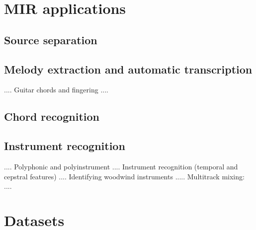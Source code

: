 \documentclass[journal]{IEEEtran}
\begin{document}
\section{MIR applications}
\subsection{Source separation}
\subsection{Melody extraction and automatic transcription}

\cite{benetos2013automatic,ohanlon2013automatic,peeters2006music}....
Guitar chords and fingering \cite{barbancho2012automatic}....
\subsection{Chord recognition}
\subsection{Instrument recognition}

\cite{martin1998musical,yu2014sparse}....
Polyphonic and polyinstrument \cite{hamel2009automatic}....
Instrument recognition (temporal and cepstral features) \cite{eronen2000musical}....
Identifying woodwind instruments \cite{brown2001feature}.....
Multitrack mixing: \cite{scottinstrument,scott2011automatic}....

\section{Datasets}

\ifCLASSOPTIONcaptionsoff
  \newpage
\fi







\end{document}
